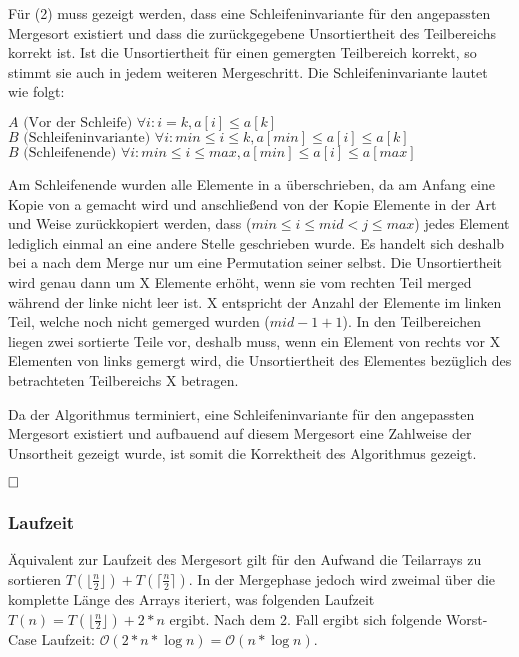 \documentclass[12pt]{scrartcl}%
\theoremstyle{nonumberplain}
\newcommand{\bO}[1]{\mathcal O(#1)}
\begin{document}
Für (2) muss gezeigt werden, dass eine Schleifeninvariante für den angepassten Mergesort existiert und dass die zurückgegebene Unsortiertheit des Teilbereichs korrekt ist. Ist die Unsortiertheit für einen gemergten Teilbereich korrekt, so stimmt sie auch in jedem weiteren Mergeschritt. Die Schleifeninvariante lautet wie folgt:

$ A \text{ (Vor der Schleife) } \forall i: i = k, a[i] \le a[k]$ \\
$ B \text{ (Schleifeninvariante) } \forall i: min \le i \le k, a[min] \le a[i] \le a[k]$ \\
$ B \text{ (Schleifenende) } \forall i: min \le i \le max, a[min] \le a[i] \le a[max]$

Am Schleifenende wurden alle Elemente in a überschrieben, da am Anfang eine Kopie von a gemacht wird und anschließend von der Kopie Elemente in der Art und Weise zurückkopiert werden, dass ($ min \le i \le mid < j \le max $) jedes Element lediglich einmal an eine andere Stelle geschrieben wurde. Es handelt sich deshalb bei a nach dem Merge nur um eine Permutation seiner selbst. Die Unsortiertheit wird genau dann um X Elemente erhöht, wenn sie vom rechten Teil merged während der linke nicht leer ist. X entspricht der Anzahl der Elemente im linken Teil, welche noch nicht gemerged wurden ($ mid - 1 + 1 $). In den Teilbereichen liegen zwei sortierte Teile vor, deshalb muss, wenn ein Element von rechts vor X Elementen von links gemergt wird, die Unsortiertheit des Elementes bezüglich des betrachteten Teilbereichs X betragen.

Da der Algorithmus terminiert, eine Schleifeninvariante für den angepassten Mergesort existiert und aufbauend auf diesem Mergesort eine Zahlweise der Unsortheit gezeigt wurde, ist somit die Korrektheit des Algorithmus gezeigt.

$\hfill \square$

\subsubsection*{Laufzeit}
Äquivalent zur Laufzeit des Mergesort gilt für den Aufwand die Teilarrays zu sortieren $ T(\lfloor \frac{n}{2} \rfloor) + T(\lceil \frac{n}{2} \rceil) $. In der Mergephase jedoch wird zweimal über die komplette Länge des Arrays iteriert, was folgenden Laufzeit $ T(n) = T(\lfloor \frac{n}{2} \rfloor) + 2 * n $ ergibt. Nach dem 2. Fall ergibt sich folgende Worst-Case Laufzeit: $ \bO{2*n*\log {n}} = \bO{n*\log {n}} $.
\end{document}
